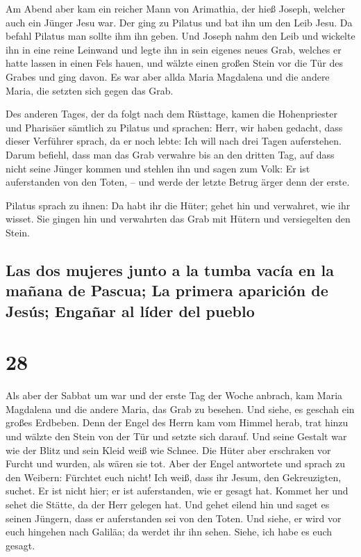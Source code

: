  Am Abend aber kam ein reicher Mann von Arimathia, der
hieß Joseph, welcher auch ein Jünger Jesu war.  Der ging
zu Pilatus und bat ihn um den Leib Jesu. Da befahl Pilatus man sollte
ihm ihn geben.  Und Joseph nahm den Leib und wickelte ihn
in eine reine Leinwand  und legte ihn in sein eigenes
neues Grab, welches er hatte lassen in einen Fels hauen, und wälzte
einen großen Stein vor die Tür des Grabes und ging davon.
 Es war aber allda Maria Magdalena und die andere Maria,
die setzten sich gegen das Grab.

 Des anderen Tages, der da folgt nach dem Rüsttage, kamen
die Hohenpriester und Pharisäer sämtlich zu Pilatus  und
sprachen: Herr, wir haben gedacht, dass dieser Verführer sprach, da er
noch lebte: Ich will nach drei Tagen auferstehen.  Darum
befiehl, dass man das Grab verwahre bis an den dritten Tag, auf dass
nicht seine Jünger kommen und stehlen ihn und sagen zum Volk: Er ist
auferstanden von den Toten, -- und werde der letzte Betrug ärger denn
der erste.

 Pilatus sprach zu ihnen: Da habt ihr die Hüter; gehet
hin und verwahret, wie ihr wisset.  Sie gingen hin und
verwahrten das Grab mit Hütern und versiegelten den Stein.

\hypertarget{las-dos-mujeres-junto-a-la-tumba-vacuxeda-en-la-mauxf1ana-de-pascua-la-primera-apariciuxf3n-de-jesuxfas-engauxf1ar-al-luxedder-del-pueblo}{%
\subsection{Las dos mujeres junto a la tumba vacía en la mañana de
Pascua; La primera aparición de Jesús; Engañar al líder del
pueblo}\label{las-dos-mujeres-junto-a-la-tumba-vacuxeda-en-la-mauxf1ana-de-pascua-la-primera-apariciuxf3n-de-jesuxfas-engauxf1ar-al-luxedder-del-pueblo}}

\hypertarget{section-27}{%
\section{28}\label{section-27}}

 Als aber der Sabbat um war und der erste Tag der Woche
anbrach, kam Maria Magdalena und die andere Maria, das Grab zu besehen.
 Und siehe, es geschah ein großes Erdbeben. Denn der Engel
des Herrn kam vom Himmel herab, trat hinzu und wälzte den Stein von der
Tür und setzte sich darauf.  Und seine Gestalt war wie der
Blitz und sein Kleid weiß wie Schnee.  Die Hüter aber
erschraken vor Furcht und wurden, als wären sie tot.  Aber
der Engel antwortete und sprach zu den Weibern: Fürchtet euch nicht! Ich
weiß, dass ihr Jesum, den Gekreuzigten, suchet.  Er ist
nicht hier; er ist auferstanden, wie er gesagt hat. Kommet her und sehet
die Stätte, da der Herr gelegen hat.  Und gehet eilend hin
und saget es seinen Jüngern, dass er auferstanden sei von den Toten. Und
siehe, er wird vor euch hingehen nach Galiläa; da werdet ihr ihn sehen.
Siehe, ich habe es euch gesagt.

